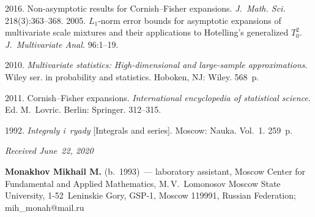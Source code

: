 \begin{multicols}{2}
{{\begin{thebibliography}{9}
{  }
 2016. Non-asymptotic results for Cornish--Fisher expansions. 
 \textit{J.~Math. Sci.} 218(3):363--368.
 2005. $L_1$-norm error bounds for asymptotic expansions of multivariate scale mixtures and their 
 applications to Hotelling's generalized $T_0^2$.  \textit{J.~Multivariate Anal.} 96:1--19.

 2010.  \textit{Multivariate statistics: High-dimensional and large-sample approximations}. 
 Wiley ser. in probability and statistics.
 Hoboken, NJ: Wiley. 568~p.
 
 2011.  Cornish--Fisher expansions.  \textit{International encyclopedia of statistical science}. 
 Ed. M.~Lovric. Berlin: Springer. 312--315.
 
 1992.  \textit{Integraly i~ryady} 
 [Integrals and series]. Moscow: Nauka. Vol.~1. 259~p.
 \end{thebibliography}

 }
 }

\end{multicols}

\vspace*{-3pt}

  \hfill{\small\textit{Received June~22, 2020}}




\Contrl

\noindent
\textbf{Monakhov Mikhail M.} (b.\ 1993)~--- 
laboratory assistant, Moscow Center for Fundamental and Applied Mathematics, 
M.\,V.~Lomonosov Moscow State University, 1-52~Leninskie Gory, GSP-1, Moscow 119991, Russian Federation; 
\mbox{mih\_monah@mail.ru}


\label{end\stat}

\renewcommand{\bibname}{\protect\rm Литература}